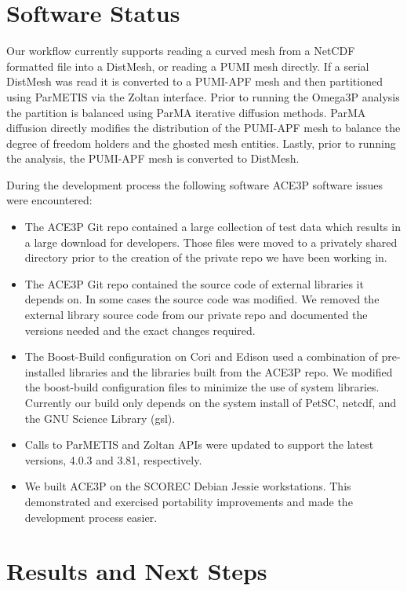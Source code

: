 \documentclass[a4paper]{article}
\begin{document}
\section{Software Status}\label{sec:software}
Our workflow currently supports reading a curved mesh from a NetCDF formatted file
into a DistMesh, or reading a PUMI mesh directly.
If a serial DistMesh was read it is converted to a PUMI-APF mesh and then 
partitioned using ParMETIS via the Zoltan interface.
Prior to running the Omega3P analysis the partition is balanced using ParMA
iterative diffusion methods.
ParMA diffusion directly modifies the distribution of the PUMI-APF mesh to
balance the degree of freedom holders and the ghosted mesh entities.
Lastly, prior to running the analysis, the PUMI-APF mesh is converted to
DistMesh.

During the development process the following software ACE3P software issues were
encountered:
\begin{itemize}
  \item The ACE3P Git repo contained a large collection of test data which
    results in a large download for developers.  Those files were moved to a
    privately shared directory prior to the creation of the private repo we have 
    been working in.
  \item The ACE3P Git repo contained the source code of
    external libraries it depends on.  In some cases the source code was modified.  
    We removed the external library source code from our private repo and documented 
    the versions needed and the exact changes required.
  \item The Boost-Build configuration on Cori and Edison used a combination 
    of pre-installed libraries and the libraries built from the ACE3P repo. We
    modified the boost-build configuration files to minimize the use of system
    libraries. Currently our build only depends on the system install of PetSC,
    netcdf, and the GNU Science Library (gsl).
  \item Calls to ParMETIS and Zoltan APIs were updated to support the latest
    versions, 4.0.3 and 3.81, respectively.
  \item We built ACE3P on the SCOREC Debian Jessie workstations.  This demonstrated 
    and exercised portability improvements and made the development process
    easier.
\end{itemize}

\section{Results and Next Steps}\label{sec:results}
\end{document}
